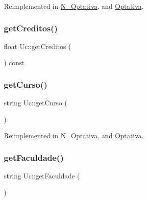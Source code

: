 Reimplemented in \hyperlink{class_n___optativa_a43cdb1dcc1c9ec42dd29497c6b4b0dd0}{N\+\_\+\+Optativa}, and \hyperlink{class_optativa_a3f02a824fbfaf7ad5f395b9bd9037ef3}{Optativa}.

\hypertarget{class_uc_aab235a5055e1a3801df9032d8e73225a}{}\label{class_uc_aab235a5055e1a3801df9032d8e73225a} 
\subsubsection{\texorpdfstring{get\+Creditos()}{getCreditos()}}
{\footnotesize\ttfamily float Uc\+::get\+Creditos (\begin{DoxyParamCaption}{ }\end{DoxyParamCaption}) const}

\hypertarget{class_uc_a30c8b684d775a3d8304fcafefea2b951}{}\label{class_uc_a30c8b684d775a3d8304fcafefea2b951} 
\subsubsection{\texorpdfstring{get\+Curso()}{getCurso()}}
{\footnotesize\ttfamily string Uc\+::get\+Curso (\begin{DoxyParamCaption}{ }\end{DoxyParamCaption})\hspace{0.3cm}{\ttfamily [virtual]}}



Reimplemented in \hyperlink{class_n___optativa_a94546c2209c4ff22d055084dc77477cd}{N\+\_\+\+Optativa}, and \hyperlink{class_optativa_a79d38d1290190327c812c3eb16f310f6}{Optativa}.

\hypertarget{class_uc_a5820a4fc8672679329f72467aa1599da}{}\label{class_uc_a5820a4fc8672679329f72467aa1599da} 
\subsubsection{\texorpdfstring{get\+Faculdade()}{getFaculdade()}}
{\footnotesize\ttfamily string Uc\+::get\+Faculdade (\begin{DoxyParamCaption}{ }\end{DoxyParamCaption})\hspace{0.3cm}{\ttfamily [virtual]}}



